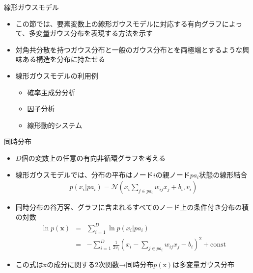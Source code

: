 \begin{frame}{線形ガウスモデル}
 \begin{itemize}
  \item この節では、要素変数上の線形ガウスモデルに対応する有向グラフによって、多変量ガウス分布を表現する方法を示す
  \item 対角共分散を持つガウス分布と一般のガウス分布とを両極端とするような興味ある構造を分布に持たせる
  \item 線形ガウスモデルの利用例
        \begin{itemize}
         \item 確率主成分分析
         \item 因子分析
         \item 線形動的システム
        \end{itemize}
 \end{itemize}
\end{frame}

\begin{frame}{同時分布}
 \begin{itemize}
  \item $D$個の変数上の任意の有向非循環グラフを考える
  \item 線形ガウスモデルでは、分布の平布はノード$i$の親ノード$pa_i$状態の線形結合
        \begin{eqnarray*}
         p(x_i|pa_i) = \mathcal{N} \left(x_i \sum_{j \in pa_i}w_{ij}x_j + b_i, v_i \right)
        \end{eqnarray*}
  \item 同時分布の谷万客、グラフに含まれるすべてのノード上の条件付き分布の積の対数
        \begin{eqnarray*}
         \ln p(\bm{x}) &=& \sum_{i=1}^{D}\ln p(x_i | pa_i)\\
         &= & -\sum_{i=1}^{D}\frac{1}{2v_i}(x_i - \sum_{j \in pa_i}w_{ij}x_j-b_i)^2 + \mathrm{const}
        \end{eqnarray*}
  \item この式は$\mathrm{x}$の成分に関する2次関数→\alert{同時分布$p(\mathrm{x})$は多変量ガウス分布}
 \end{itemize}
\end{frame}

